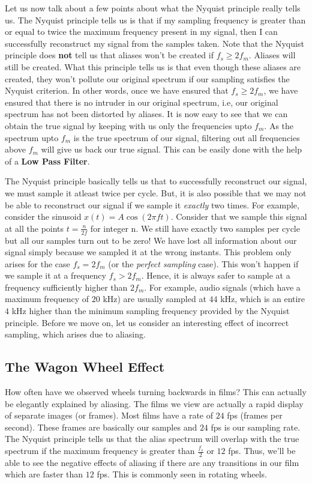 \documentclass{article}
\theoremstyle{definition}
\begin{document}
		Let us now talk about a few points about what the Nyquist principle really tells us. The Nyquist principle tells us is that if my sampling frequency is greater than or equal to twice the maximum frequency present in my signal, then I can successfully reconstruct my signal from the samples taken. Note that the Nyquist principle does \textbf{not} tell us that aliases won't be created if $f_s \geq 2f_m$. Aliases will still be created. What this principle tells us is that even though these aliases are created, they won't pollute our original spectrum if our sampling satisfies the Nyquist criterion. In other words, once we have ensured that $f_s \geq 2f_m$, we have ensured that there is no intruder in our original spectrum, i.e, our original spectrum has not been distorted by aliases. It is now easy to see that we can obtain the true signal by keeping with us only the frequencies upto $f_m$. As the spectrum upto $f_m$ is the true spectrum of our signal, filtering out all frequencies above $f_m$ will give us back our true signal. This can be easily done with the help of a \textbf{Low Pass Filter}. \smallskip
		
		The Nyquist principle basically tells us that to successfully reconstruct our signal, we must sample it atleast twice per cycle. But, it is also possible that we may not be able to reconstruct our signal if we sample it \textit{exactly} two times. For example, consider the sinusoid $x(t) = A\cos(2\pi ft)$. Consider that we sample this signal at all the points $t = \frac{n}{2f}$ for integer n. We still have exactly two samples per cycle but all our samples turn out to be zero! We have lost all information about our signal simply because we sampled it at the wrong instants. This problem only arises for the case $f_s = 2f_m$ (or the \textit{perfect sampling} case). This won't happen if we sample it at a frequency $f_s > 2f_m$. Hence, it is always safer to sample at a frequency sufficiently higher than $2f_m$. For example, audio signals (which have a maximum frequency of $20$ kHz) are usually sampled at $44$ kHz, which is an  entire $4$ kHz higher than the minimum sampling frequency provided by the Nyquist principle. Before we move on, let us consider an interesting effect of incorrect sampling, which arises due to aliasing. 
		
		\subsection{The Wagon Wheel Effect}
		
		How often have we observed wheels turning backwards in films? This can actually be elegantly explained by aliasing. The films we view are actually a rapid display of separate images (or frames). Most films have a rate of $24$ fps (frames per second). These frames are basically our samples and $24$ fps is our sampling rate. The Nyquist principle tells us that the alias spectrum will overlap with the true spectrum if the maximum frequency is greater than $\frac{f_s}{2}$ or $12$ fps. Thus, we'll be able to see the negative effects of aliasing if there are any transitions in our film which are faster than $12$ fps. This is commonly seen in rotating wheels.  \smallskip
		
\end{document}
